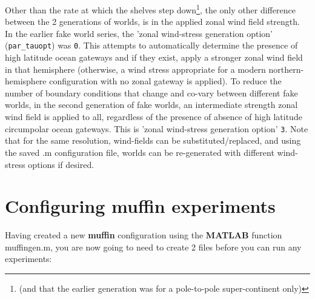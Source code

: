 \documentclass[11pt,fleqn]{book} %
\begin{document}
Other than the rate at which the shelves step down\footnote{(and that the earlier generation was for a pole-to-pole super-continent only)}, the only other difference between the 2 generations of worlds, is in the applied zonal wind field strength. In the earlier fake world series, the 'zonal wind-stress generation option' (\texttt{par\_tauopt}) was \texttt{0}. This attempts to automatically determine the presence of high latitude ocean gateways and if they exist, apply a stronger zonal wind field in that hemisphere (otherwise, a wind stress appropriate for a modern northern-hemisphere configuration with no zonal gateway is applied). To reduce the number of boundary conditions that change and co-vary between different fake worlds, in the second generation of fake worlds, an intermediate strength zonal wind field is applied to all, regardless of the presence of absence of high latitude circumpolar ocean gateways. This is  'zonal wind-stress generation option' \texttt{3}. Note that for the same resolution, wind-fields can be substituted/replaced, and using the saved \textsf{\footnotesize .m} configuration file, worlds can be re-generated with different wind-stress options if desired.

%
%

\newpage

\section{Configuring muffin experiments}


Having created a new \textbf{muffin} configuration using the \textbf{MATLAB} function \textsf{\footnotesize muffingen.m}, you are now going to need to create 2 files before you can run any experiments:
\end{document}
